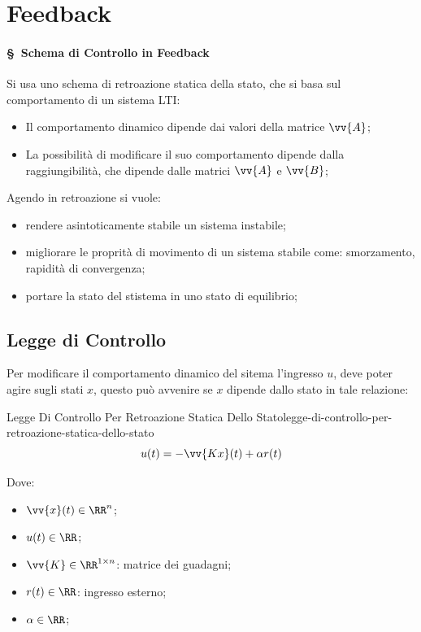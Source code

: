 \documentclass[12pt]{article}
\begin{document}
\newpage
\section{Feedback}
\paragraph{\S~Schema di Controllo in Feedback}
Si usa uno schema di retroazione statica della stato, che si basa sul comportamento di un sistema LTI:
\begin{itemize}
    \item Il comportamento dinamico dipende dai valori della matrice $\vv{A}$;
    \item La possibilit\`a di modificare il suo comportamento dipende dalla raggiungibilit\`a, che dipende dalle matrici $\vv{A}$ e $\vv{B}$;
\end{itemize}
Agendo in retroazione si vuole:
\begin{itemize}
    \item rendere asintoticamente stabile un sistema instabile;
    \item migliorare le proprit\`a di movimento di un sistema stabile come: smorzamento, rapidit\`a di convergenza;
    \item portare la stato del stistema in uno stato di equilibrio;
\end{itemize}

\subsection{Legge di Controllo}
Per modificare il comportamento dinamico del sitema l'ingresso $u$, deve poter agire sugli stati $x$, questo pu\`o avvenire se $x$ dipende dallo stato in tale relazione:
\begin{definition}{Legge Di Controllo Per Retroazione Statica Dello Stato}{legge-di-controllo-per-retroazione-statica-dello-stato}
    \[ u(t) = -\vv{Kx}(t) + \alpha r(t) \]
\end{definition}

Dove:
\begin{itemize}
    \item $\vv{x}(t) \in \RR^{n}$;
    \item $u(t) \in \RR$;
    \item $\vv{K} \in \RR^{1 \times n}$: matrice dei guadagni;
    \item $r(t) \in \RR$: ingresso esterno;
    \item $\alpha \in \RR$;
\end{itemize}
\end{document}
